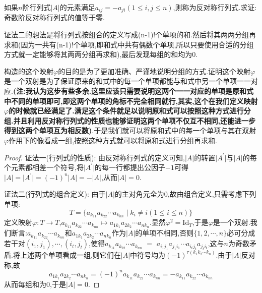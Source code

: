 \documentclass[../../main.tex]{subfiles}%
\begin{document}
\begin{proposition}[奇数阶反对称行列式的值等于零]\label{proposition:奇数阶反对称行列式的值等于零}
如果\(n\)阶行列式\(\vert A\vert\)的元素满足\(a_{ij}=-a_{ji}(1\leqslant  i,j\leqslant  n)\),则称为反对称行列式.求证:奇数阶反对称行列式的值等于零.
\end{proposition}
\begin{note}
{\color{blue}证法二}的想法是将行列式按组合的定义写成(n-1)!个单项的和.然后将其两两分组再求和(因为一共有(n-1)!个单项,即和式中共有偶数个单项,所以只要使用合适的分组方式就一定能够将其两两分组再求和),最后发现每组的和均为0.

构造的这个映射$\varphi$的目的是为了更加准确、严谨地说明分组的方式.证明这个映射$\varphi$是一个双射是为了保证原来的和式中的每一个单项都能与和式中另一个单项一一对应.\textbf{(注:我认为这步有些多余.这里应该只需要说明这两个一一对应的单项是原和式中不同的单项即可,即这两个单项的角标不完全相同就行,其实,这个在我们定义映射$\varphi$的时候就已经满足了.满足这个条件就足以说明原和式可以按照这种方式进行分组.并且利用反对称行列式的性质也能够证明这两个单项不仅互不相同,还能进一步得到这两个单项互为相反数)}.于是我们就可以将原和式中的每一个单项与其在双射$\varphi$作用下的像看成一组,按照这种方式就可以将原和式进行分组再求和.
\end{note}
\begin{proof}

{\color{blue}证法一(行列式的性质):}
由反对称行列式的定义可知,\(\vert A\vert\)的转置\(\vert A^{\prime}\vert\)与\(\vert A\vert\)的每个元素都相差一个符号,将\(\vert A^{\prime}\vert\)的每一行都提出公因子\(-1\)可得\(\vert A\vert=\vert A^{\prime}\vert=(-1)^{n}\vert A\vert=-\vert A\vert\),从而\(\vert A\vert = 0\).

{\color{blue}证法二(行列式的组合定义):}
由于\(\vert A\vert\)的主对角元全为0,故由组合定义,只需考虑下列单项:
\[
T = \{a_{k_11}a_{k_22}\cdots a_{k_{nn}} \mid k_i\neq i(1\leqslant  i\leqslant  n)\}
\]
定义映射\(\varphi:T\to T\),\(a_{k_11}a_{k_22}\cdots a_{k_{nn}}\mapsto a_{1k_1}a_{2k_2}\cdots a_{nk_n}\).显然\(\varphi^2 = \text{Id}_T\),于是\(\varphi\)是一个双射.我们断言:\(a_{k_11}a_{k_22}\cdots a_{k_{nn}}\)和\(a_{1k_1}a_{2k_2}\cdots a_{nk_n}\)作为\(\vert A\vert\)的单项不相同,否则\(\{1,2,\cdots,n\}\)必可分成若干对\((i_1,j_1),\cdots,(i_t,j_t)\),使得$a_{k_11}$$a_{k_22}$$\cdots $$a_{k_{nn}}$ $=$ $a_{i_1j_1}$$a_{j_1i_1}$$\cdots$$ a_{i_tj_t}$$a_{j_ti_t}$,这与\(n\)为奇数矛盾.将上述两个单项看成一组,则它们在\(\vert A\vert\)中符号均为\((-1)^{\tau(k_1k_2\cdots k_n)}\).由于\(\vert A\vert\)反对称,故
\[
a_{1k_1}a_{2k_2}\cdots a_{nk_n}=(-1)^n a_{k_11}a_{k_22}\cdots a_{k_{nn}}=-a_{k_11}a_{k_22}\cdots a_{k_{nn}}
\]
从而每组和为0,于是\(\vert A\vert = 0\).
\end{proof}
\end{document}
